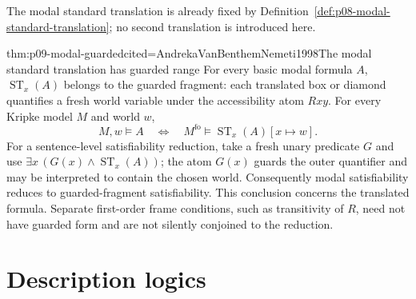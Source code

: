 The modal standard translation is already fixed by
Definition~\ref{def:p08-modal-standard-translation}; no second translation is
introduced here.

\begin{hbtheorem}{thm:p09-modal-guarded}{cited=AndrekaVanBenthemNemeti1998}{The modal standard translation has guarded range}
For every basic modal formula \(A\),
\(\operatorname{ST}_x(A)\) belongs to the guarded fragment: each translated
box or diamond quantifies a fresh world variable under the accessibility atom
\(Rxy\).  For every Kripke model \(M\) and world \(w\),
\[
 M,w\models A
 \quad\Longleftrightarrow\quad
 M^{\mathrm{fo}}\models\operatorname{ST}_x(A)[x\mapsto w].
\]
For a sentence-level satisfiability reduction, take a fresh unary predicate
\(G\) and use
\(\exists x\,(G(x)\land\operatorname{ST}_x(A))\); the atom \(G(x)\) guards the
outer quantifier and may be interpreted to contain the chosen world.
Consequently modal satisfiability reduces to guarded-fragment satisfiability.
This conclusion concerns the translated formula.  Separate first-order frame
conditions, such as transitivity of \(R\), need not have guarded form and are
not silently conjoined to the reduction.
\end{hbtheorem}






\section{Description logics}
\label{sec:p09-description-logics}

